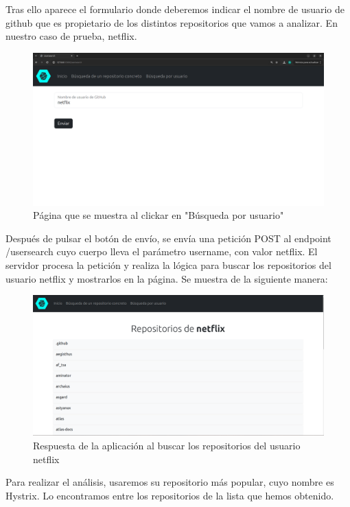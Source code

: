 \documentclass[a4paper, 12pt]{book}
\begin{document}
Tras ello aparece el formulario donde deberemos indicar el nombre de usuario de github que es propietario de los distintos repositorios que vamos a analizar. En nuestro caso de prueba, netflix.

\begin{figure}[H]
  \centering
  \includegraphics[width=1\textwidth]{img/getusersearch.png}
  \caption{Página que se muestra al clickar en "Búsqueda por usuario"}
  \label{figura:getusersearch}
\end{figure}

Después de pulsar el botón de envío, se envía una petición POST al endpoint /usersearch cuyo cuerpo lleva el parámetro username, con valor netflix. El servidor procesa la petición y realiza la lógica para buscar los repositorios del usuario netflix y mostrarlos en la página. Se muestra de la siguiente manera:

\begin{figure}[H]
  \centering
  \includegraphics[width=1\textwidth]{img/listanetflix.png}
  \caption{Respuesta de la aplicación al buscar los repositorios del usuario netflix}
  \label{figura:netflixresp}
\end{figure}

Para realizar el análisis, usaremos su repositorio más popular, cuyo nombre es Hystrix. Lo encontramos entre los repositorios de la lista que hemos obtenido.
\end{document}
